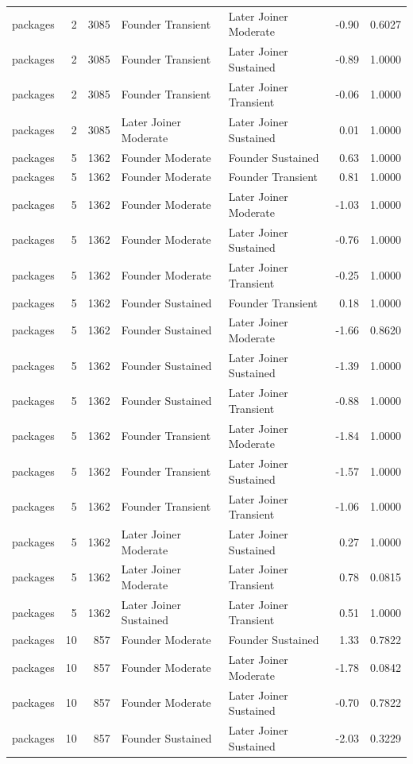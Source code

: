 \begin{table}[H]
{\begin{tabular}{l r r l l r r}
packages & 2 & 3085 & Founder Transient & Later Joiner Moderate & -0.90 & 0.6027 \\ 
packages & 2 & 3085 & Founder Transient & Later Joiner Sustained & -0.89 & 1.0000 \\ 
packages & 2 & 3085 & Founder Transient & Later Joiner Transient & -0.06 & 1.0000 \\ 
packages & 2 & 3085 & Later Joiner Moderate & Later Joiner Sustained & 0.01 & 1.0000 \\ 
packages & 5 & 1362 & Founder Moderate & Founder Sustained & 0.63 & 1.0000 \\ 
packages & 5 & 1362 & Founder Moderate & Founder Transient & 0.81 & 1.0000 \\ 
packages & 5 & 1362 & Founder Moderate & Later Joiner Moderate & -1.03 & 1.0000 \\ 
packages & 5 & 1362 & Founder Moderate & Later Joiner Sustained & -0.76 & 1.0000 \\ 
packages & 5 & 1362 & Founder Moderate & Later Joiner Transient & -0.25 & 1.0000 \\ 
packages & 5 & 1362 & Founder Sustained & Founder Transient & 0.18 & 1.0000 \\ 
packages & 5 & 1362 & Founder Sustained & Later Joiner Moderate & -1.66 & 0.8620 \\ 
packages & 5 & 1362 & Founder Sustained & Later Joiner Sustained & -1.39 & 1.0000 \\ 
packages & 5 & 1362 & Founder Sustained & Later Joiner Transient & -0.88 & 1.0000 \\ 
packages & 5 & 1362 & Founder Transient & Later Joiner Moderate & -1.84 & 1.0000 \\ 
packages & 5 & 1362 & Founder Transient & Later Joiner Sustained & -1.57 & 1.0000 \\ 
packages & 5 & 1362 & Founder Transient & Later Joiner Transient & -1.06 & 1.0000 \\ 
packages & 5 & 1362 & Later Joiner Moderate & Later Joiner Sustained & 0.27 & 1.0000 \\ 
packages & 5 & 1362 & Later Joiner Moderate & Later Joiner Transient & 0.78 & 0.0815 \\ 
packages & 5 & 1362 & Later Joiner Sustained & Later Joiner Transient & 0.51 & 1.0000 \\ 
packages & 10 & 857 & Founder Moderate & Founder Sustained & 1.33 & 0.7822 \\ 
packages & 10 & 857 & Founder Moderate & Later Joiner Moderate & -1.78 & 0.0842 \\ 
packages & 10 & 857 & Founder Moderate & Later Joiner Sustained & -0.70 & 0.7822 \\ 
packages & 10 & 857 & Founder Sustained & Later Joiner Sustained & -2.03 & 0.3229 \\ 
\bottomrule
\end{tabular}%
} 
\end{table}

